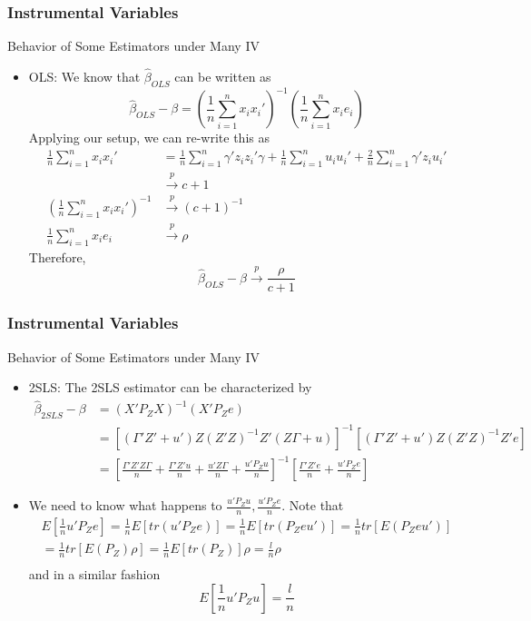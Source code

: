 \documentclass{beamer}
\begin{document}
\begin{frame}
\frametitle{Instrumental Variables}
Behavior of Some Estimators under Many IV
\begin{itemize}
\item OLS: We know that $\hat{\beta}_{OLS}$ can be written as
\footnotesize{\[
\hat{\beta}_{OLS}-\beta=\left(\frac{1}{n}\sum_{i=1}^n x_ix_i'\right)^{-1}\left(\frac{1}{n}\sum_{i=1}^n x_ie_i\right)
\]}\normalsize
Applying our setup, we can re-write this as
\footnotesize{\[
\begin{aligned}
\frac{1}{n}\sum_{i=1}^n x_ix_i'&=\frac{1}{n}\sum_{i=1}^n \gamma'z_iz_i'\gamma+\frac{1}{n}\sum_{i=1}^n u_iu_i'+\frac{2}{n}\sum_{i=1}^n \gamma'z_iu_i'\\
&\xrightarrow{p} c+1\\
\left(\frac{1}{n}\sum_{i=1}^n x_ix_i'\right)^{-1}&\xrightarrow{p} (c+1)^{-1}\\
\frac{1}{n}\sum_{i=1}^n x_ie_i&\xrightarrow{p}\rho
\end{aligned}
\]}\normalsize
Therefore, 
\[
\hat{\beta}_{OLS}-\beta\xrightarrow{p}\frac{\rho}{c+1}
\]
\end{itemize}
\end{frame}

\begin{frame}
\frametitle{Instrumental Variables}
Behavior of Some Estimators under Many IV 
\begin{itemize}
\item 2SLS: The 2SLS estimator can be characterized by
\footnotesize{\[
\begin{aligned}
\hat{\beta}_{2SLS}-\beta&=(X'P_ZX)^{-1}(X'P_Ze)\\
&=[(\Gamma'Z'+u')Z(Z'Z)^{-1}Z'(Z\Gamma+u)]^{-1}[(\Gamma'Z'+u')Z(Z'Z)^{-1}Z'e]\\
&=[\frac{\Gamma'Z'Z\Gamma}{n}+\frac{\Gamma'Z'u}{n}+\frac{u'Z\Gamma}{n}+\frac{u'P_Zu}{n}]^{-1}[\frac{\Gamma'Z'e}{n}+\frac{u'P_Ze}{n}]
\end{aligned}
\]}\normalsize
\item We need to know what happens to $\frac{u'P_Zu}{n}, \frac{u'P_Ze}{n} $. Note that
\footnotesize{\begin{gather*}
E\left[\frac{1}{n}u'P_Ze\right]=\frac{1}{n}E[tr(u'P_Ze)]=\frac{1}{n}E[tr(P_Zeu')]=\frac{1}{n}tr[E(P_Zeu')]\\
=\frac{1}{n}tr[E(P_Z)\rho]=\frac{1}{n}E[tr(P_Z)]\rho=\frac{l}{n}\rho\\
\end{gather*}}\normalsize
and in a similar fashion 
\footnotesize{\[
E\left[\frac{1}{n}u'P_Zu\right] = \frac{l}{n}
\]}\normalsize
\end{itemize}
\end{frame}
\end{document}

